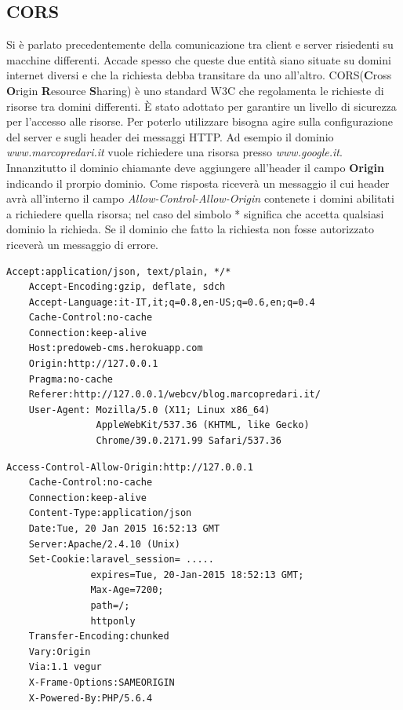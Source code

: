 \subsection{CORS}

Si è parlato precedentemente della comunicazione tra client e server risiedenti su macchine differenti. Accade spesso che queste due entità siano situate su domini internet diversi e che la richiesta debba transitare da uno all'altro. CORS(\textbf{C}ross \textbf{O}rigin \textbf{R}esource \textbf{S}haring) è uno standard W3C che regolamenta le richieste di risorse tra domini differenti. È stato adottato per garantire un livello di sicurezza per l'accesso alle risorse. Per poterlo utilizzare bisogna agire sulla configurazione del server e sugli header dei messaggi HTTP.
Ad esempio il dominio \emph{www.marcopredari.it} vuole richiedere una risorsa presso \emph{www.google.it}. Innanzitutto il dominio chiamante deve aggiungere all'header il campo \textbf{Origin} indicando il prorpio dominio. Come risposta riceverà un messaggio il cui header avrà all'interno il campo \textit{Allow-Control-Allow-Origin} contenete i domini abilitati a richiedere quella risorsa; nel caso del simbolo * significa che accetta qualsiasi dominio la richieda. Se il dominio che fatto la richiesta non fosse autorizzato riceverà un messaggio di errore. \cite{web:cors}

\begin{lstlisting}[caption={esempio di richiesta HTTP utilizzando CORS}, label={lst:CORSrequest}]
	Accept:application/json, text/plain, */*
	Accept-Encoding:gzip, deflate, sdch
	Accept-Language:it-IT,it;q=0.8,en-US;q=0.6,en;q=0.4
	Cache-Control:no-cache
	Connection:keep-alive
	Host:predoweb-cms.herokuapp.com
	Origin:http://127.0.0.1
	Pragma:no-cache
	Referer:http://127.0.0.1/webcv/blog.marcopredari.it/
	User-Agent: Mozilla/5.0 (X11; Linux x86_64) 
			    AppleWebKit/537.36 (KHTML, like Gecko) 
			    Chrome/39.0.2171.99 Safari/537.36
\end{lstlisting}
\begin{lstlisting}[caption={esempio di risposta dal server che utilizza CORS}, label={lst:CORSanswer}]
	Access-Control-Allow-Origin:http://127.0.0.1
	Cache-Control:no-cache
	Connection:keep-alive
	Content-Type:application/json
	Date:Tue, 20 Jan 2015 16:52:13 GMT
	Server:Apache/2.4.10 (Unix)
	Set-Cookie:laravel_session= .....
			   expires=Tue, 20-Jan-2015 18:52:13 GMT; 
			   Max-Age=7200; 
			   path=/; 
			   httponly
	Transfer-Encoding:chunked
	Vary:Origin
	Via:1.1 vegur
	X-Frame-Options:SAMEORIGIN
	X-Powered-By:PHP/5.6.4
\end{lstlisting}

